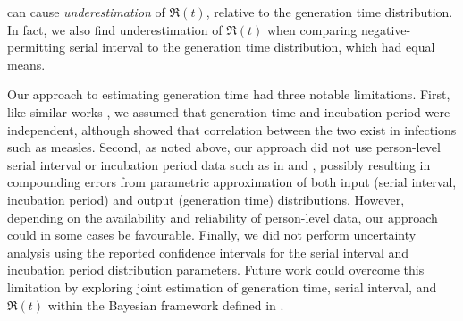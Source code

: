 can cause \emph{underestimation} of $\Re(t)$, relative to the generation time distribution.
In fact, we also find underestimation of $\Re(t)$ when comparing
negative-permitting serial interval to the generation time distribution,
which had equal means.
\par
Our approach to estimating generation time had three notable limitations.
First, like similar works \citep{Kuk2005,Ganyani2020}, we assumed that
generation time and incubation period were independent,
although \citet{Klinkenberg2011} showed that
correlation between the two exist in infections such as measles.
Second, as noted above, our approach did not use
person-level serial interval or incubation period data
such as in \citep{Ganyani2020} and \citep{Klinkenberg2011},
possibly resulting in compounding errors from
parametric approximation of both input (serial interval, incubation period)
and output (generation time) distributions.
However, depending on the availability and reliability of person-level data,
our approach could in some cases be favourable.
Finally, we did not perform uncertainty analysis using
the reported confidence intervals for
the serial interval and incubation period distribution parameters.
Future work could overcome this limitation by exploring
joint estimation of generation time, serial interval, and $\Re(t)$
within the Bayesian framework defined in \citep{Cori2013}.